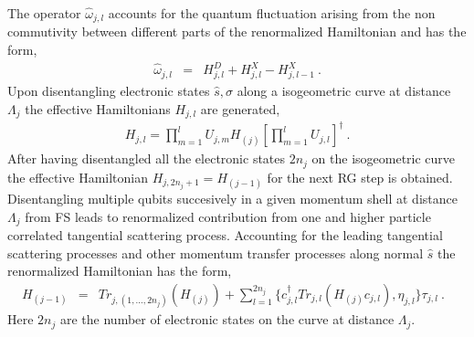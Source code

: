 \documentclass[aps,prx,preprint,groupedaddress]{revtex4-2}
\begin{document}
The operator $\hat{\omega}_{j,l}$ accounts for the quantum fluctuation arising from the non commutivity between different parts of the renormalized Hamiltonian and has the form,\cite{anirbanurg1}
\begin{eqnarray}
\hat{\omega}_{j,l}&=&H^{D}_{j,l}+H^{X}_{j,l}-H^{X}_{j,l-1}~.\label{qfOp}
\end{eqnarray}
Upon disentangling electronic states $\hat{s},\sigma$ along a isogeometric curve at distance $\Lambda_{j}$ the effective Hamiltonians $H_{j,l}$ are generated,
\begin{eqnarray}
H_{j,l}=\prod_{m=1}^{l}U_{j,m}H_{(j)}[\prod_{m=1}^{l}U_{j,l}]^{\dagger}~.
\end{eqnarray}
After having disentangled all the electronic states $2n_{j}$ on the isogeometric curve the effective Hamiltonian $H_{j,2n_{j}+1}=H_{(j-1)}$ for the next RG step is obtained. Disentangling multiple qubits succesively in a given momentum shell at distance $\Lambda_{j}$ from FS leads to renormalized contribution from one and higher  particle correlated tangential scattering process. Accounting for the leading tangential scattering processes and other momentum transfer processes along normal $\hat{s}$ the renormalized Hamiltonian has the form,
\begin{eqnarray}
H_{(j-1)}&=&Tr_{j,(1,\ldots,2n_{j})}(H_{(j)})+\sum_{l=1}^{2n_{j}}\lbrace c^{\dagger}_{j,l}Tr_{j,l}(H_{(j)}c_{j,l}),\eta_{j,l}\rbrace\tau_{j,l}~.~~~\label{HRG}
\end{eqnarray}
Here $2n_{j}$ are the number of electronic states on the curve at distance $\Lambda_{j}$.
\end{document}
